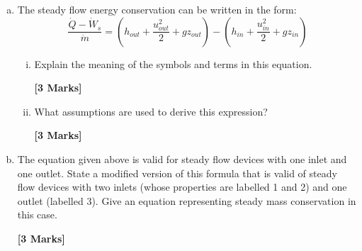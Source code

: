 \documentclass[calculator,refrigeranttables,datasheet,resit]{exam}
\newcommand{\frc}{\displaystyle\frac}
\begin{document}
\begin{question} \vspace{-2\baselineskip}
\begin{enumerate}[(a)]

\item The steady flow energy conservation can be written in the form:
\begin{displaymath}
\frc{\dot{Q}-\dot{W}_{s}}{\dot{m}} = \left(h_{out} + \frc{u_{out}^{2}}{2}+ g z_{out}\right) - \left(h_{in} + \frc{u_{in}^{2}}{2}+ g z_{in}\right)
\end{displaymath}
\begin{enumerate}[(i)]
\item Explain the meaning of the symbols and terms in this equation.
\begin{flushright}
{\bf [3 Marks]}
\end{flushright} 
\item What assumptions are used to derive this expression?
\begin{flushright}
{\bf [3 Marks]}
\end{flushright} 
\end{enumerate}

\item The equation given above is valid for steady flow devices with one inlet and one outlet. State a modified version of this formula that is valid of steady flow devices with two inlets (whose properties are labelled 1 and 2) and one outlet (labelled 3). Give an equation representing steady mass conservation in this case.
\begin{flushright}
{\bf [3 Marks]}
\end{flushright} 


\end{enumerate}
\end{question}
\end{document}
